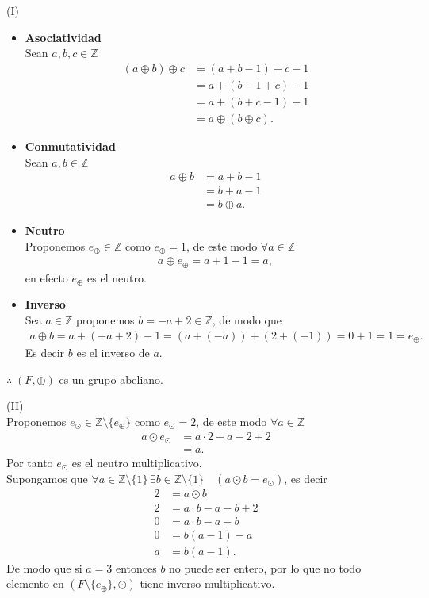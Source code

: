 \documentclass[11pt,letterpaper]{article}
\newcommand{\Z}{\mathbb{Z}}
\begin{document}
	\begin{tcolorbox}[title=Demostración, colframe=G, coltitle=B, fonttitle=\bfseries]
		(I)
	   \begin{itemize}
		\item \textbf{Asociatividad} \\
		Sean $a,b,c\in\Z$
		\begin{align*}
			(a\oplus b)\oplus c&=(a+b-1)+c-1\\
			&=a+(b-1+c)-1\\
			&=a+(b+c-1)-1\\
			&=a\oplus(b\oplus c).
		\end{align*}
		\item \textbf{Conmutatividad}\\
		Sean $a,b\in\Z$
		\begin{align*}
			a\oplus b&=a+b-1\\
			&=b+a-1\\
			&=b\oplus a.
		\end{align*}
		\item \textbf{Neutro}\\
		Proponemos $e_{\oplus}\in\Z$ como $e_{\oplus}=1$, de este modo $\forall a\in\Z$
			\begin{align*}
				a\oplus e_{\oplus}=a+1-1=a,
			\end{align*}
			en efecto $e_{\oplus}$ es el neutro.
			\item \textbf{Inverso}\\
			Sea $a\in\Z$ proponemos $b=-a+2\in\Z$, de modo que
			\begin{align*}
				a\oplus b=a+(-a+2)-1=(a+(-a))+(2+(-1))=0+1=1=e_{\oplus}.
			\end{align*}
			Es decir $b$ es el inverso de $a$.
	   \end{itemize}
	   $\therefore\; (F,\oplus)$ es un grupo abeliano.
\end{tcolorbox}
\begin{tcolorbox}
	(II)\\
	Proponemos $e_\odot\in\Z\setminus\{e_\oplus\}$ como $e_\odot=2$, de este modo $\forall a\in\Z$
	\begin{align*}
	 a\odot{e_\odot}&=a\cdot2-a-2+2\\
	 &=a.
	\end{align*}
	Por tanto $e_\odot$ es el neutro multiplicativo.\\
Supongamos que $\forall a \in \Z\setminus\{1\}\,\exists b\in\Z\setminus\{1\} \quad (a\odot b =e_\odot)$, es decir
	\begin{align*}
		2&=a\odot b\\
		2&=a\cdot b-a-b+2\\
		0&=a\cdot b-a-b\\
		0&=b(a-1)-a\\
		a&=b(a-1).
	\end{align*}
	De modo que si $a=3$ entonces $b$ no puede ser entero, por lo que no todo elemento en $(F\setminus\{e_\oplus\},\odot)$ tiene inverso multiplicativo.
\end{tcolorbox}
\end{document}
